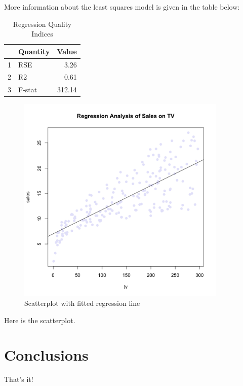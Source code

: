 \documentclass{article}\usepackage[]{graphicx}\usepackage[]{color}
\begin{document}
More information about the least squares model is given in the table below:\\
\begin{table}[ht]
\centering
\caption{Regression Quality Indices} 
\begin{tabular}{rlr}
  \hline
 & Quantity & Value \\ 
  \hline
1 & RSE & 3.26 \\ 
  2 & R2 & 0.61 \\ 
  3 & F-stat & 312.14 \\ 
   \hline
\end{tabular}
\end{table}



\begin{figure}[!hb]
\centering
\includegraphics[width=10cm]{scatterplot-tv-sales.png}
\caption{Scatterplot with fitted regression line}
\end{figure}

Here is the scatterplot.

\section*{Conclusions} That's it!
\end{document}
